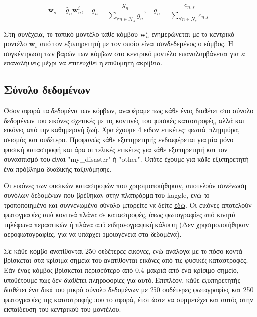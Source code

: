 \vspace{-5pt}

\begin{equation}
   \mathbf{w}_s = \hat{g}_n \mathbf{w}_n^i, \quad \hat{g}_n = \frac{g_n}{\sum\limits_{\forall n \in \mathcal{N}_s} g_n}, \quad g_n = \frac{c_{n,s}}{\sum\limits_{\forall n \in N_s} c_{n,s}}
    \label{eq15}
\end{equation}

\vspace{-5pt}

Στη συνέχεια, το τοπικό μοντέλο κάθε κόμβου $\mathbf{w}_n^i$ ενημερώνεται με το κεντρικό μοντέλο $\mathbf{w}_s$ από τον εξυπηρετητή με τον οποίο είναι συνδεδεμένος ο κόμβος. Η συγκέντρωση των βαρών των κόμβων στο κεντρικό μοντέλο επαναλαμβάνεται για $\kappa$ επαναλήψεις μέχρι να επιτευχθεί η επιθυμητή ακρίβεια.

\subsection{Σύνολο δεδομένων}

Όσον αφορά τα δεδομένα των κόμβων, αναφέραμε πως κάθε ένας διαθέτει στο σύνολο δεδομένων του εικόνες σχετικές με τις κοντινές του φυσικές καταστροφές, αλλά και εικόνες από την καθημερινή ζωή. Άρα έχουμε 4 ειδών ετικέτες: φωτιά, πλημμύρα, σεισμός και ουδέτερο. Προφανώς κάθε εξυπηρετητής ενδιαφέρεται για μία μόνο φυσική καταστροφή και άρα οι τελικές ετικέτες για κάθε εξυπηρετητή και τον συνασπισμό του είναι "my\_disaster" ή "other". Οπότε έχουμε για κάθε εξυπηρετητή ένα πρόβλημα δυαδικής ταξινόμησης.

Οι εικόνες των φυσικών καταστροφών που χρησιμοποιήθηκαν, αποτελούν συνένωση συνόλων δεδομένων που βρέθηκαν στην πλατφόρμα του kaggle, ενώ το τροποποιημένο και συννενωμένο σύνολο μπορείτε να δείτε \href{https://www.kaggle.com/datasets/georgemystriotis/disasters-dataset}{\underline{εδώ}}. Οι εικόνες αποτελούν φωτογραφίες από κοντινά πλάνα σε καταστροφές, όπως φωτογραφίες από κινητά τηλέφωνα περαστικών ή πλάνα από ειδησεογραφική κάλυψη (Δεν χρησιμοποιήθηκαν αεροφωτογραφίες, για να υπάρχει ομοιογένεια στα δεδομένα).

Σε κάθε κόμβο ανατίθονται 250 ουδέτερες εικόνες, ενώ ανάλογα με το πόσο κοντά βρίσκεται στα κρίσιμα σημεία του ανατίθονται εικόνες από τις φυσικές καταστροφές. Εάν ένας κόμβος βρίσκεται περισσότερο από 0.4 μακριά από ένα κρίσιμο σημείο, υποθέτουμε πως δεν διαθέτει πληροφορίες για αυτό. Επιπλέον, κάθε εξυπηρετητής διαθέτει ένα δικό του μικρό σύνολο δεδομένων με 250 ουδέτερες φωτογραφίες και 250 φωτογραφίες της καταστροφής που το αφορά, έτσι ώστε να συμμετέχει και αυτός στην εκπαίδευση του κεντρικού του μοντέλου.

